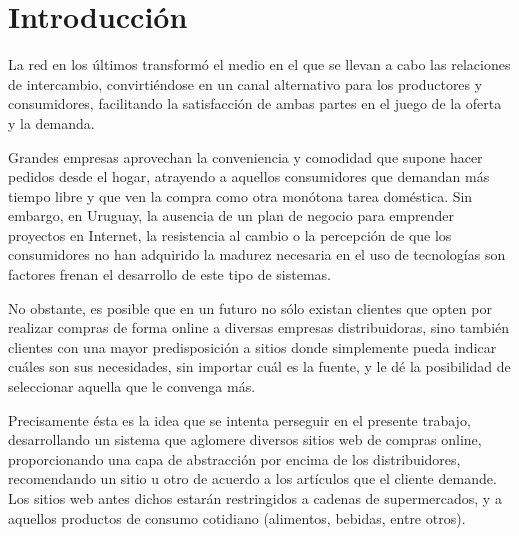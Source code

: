 \documentclass[12pt]{article} %
\begin{document}

\tableofcontents %

\newpage %


\section{Introducción} 
La red en los últimos transformó el medio en el que se llevan a cabo las relaciones de intercambio, convirtiéndose en un canal alternativo para los productores y consumidores, facilitando la satisfacción de ambas partes en el juego de la oferta y la demanda.

Grandes empresas aprovechan la conveniencia y comodidad que supone hacer pedidos desde el hogar, atrayendo a aquellos consumidores que demandan más tiempo libre y que ven la compra como otra monótona tarea doméstica. Sin embargo, en Uruguay, la ausencia de un plan de negocio para emprender proyectos en Internet, la resistencia al cambio o la percepción de que los consumidores no han adquirido la madurez necesaria en el uso de tecnologías son factores frenan el desarrollo de este tipo de sistemas. 

No obstante, es posible que en un futuro no sólo existan clientes que opten por realizar compras de forma online a diversas empresas distribuidoras, sino también clientes con una mayor predisposición a sitios donde simplemente pueda indicar cuáles son sus necesidades, sin importar cuál es la fuente, y le dé la posibilidad de seleccionar aquella que le convenga más. 

Precisamente ésta es la idea que se intenta perseguir en el presente trabajo, desarrollando un sistema que aglomere diversos sitios web de compras online, proporcionando una capa de abstracción por encima de los distribuidores, recomendando un sitio u otro de acuerdo a los artículos que el cliente demande. Los sitios web antes dichos estarán restringidos a cadenas de supermercados, y a aquellos productos de consumo cotidiano (alimentos, bebidas, entre otros).
\end{document}
